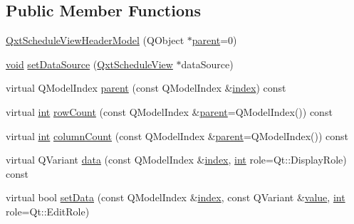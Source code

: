 \subsection*{Public Member Functions}
\begin{DoxyCompactItemize}
\item 
\hyperlink{class_qxt_schedule_view_header_model_a20e4f92d2f5cf0b79857829292564d18}{Qxt\-Schedule\-View\-Header\-Model} (Q\-Object $\ast$\hyperlink{class_qxt_schedule_view_header_model_af5e684555f4cc8ecab668a898cc92406}{parent}=0)
\item 
\hyperlink{group___u_a_v_objects_plugin_ga444cf2ff3f0ecbe028adce838d373f5c}{void} \hyperlink{class_qxt_schedule_view_header_model_a54435f3bf7b9c51dc365437e62ad3723}{set\-Data\-Source} (\hyperlink{class_qxt_schedule_view}{Qxt\-Schedule\-View} $\ast$data\-Source)
\item 
virtual Q\-Model\-Index \hyperlink{class_qxt_schedule_view_header_model_af5e684555f4cc8ecab668a898cc92406}{parent} (const Q\-Model\-Index \&\hyperlink{glext_8h_ab47dd9958bcadea08866b42bf358e95e}{index}) const 
\item 
virtual \hyperlink{ioapi_8h_a787fa3cf048117ba7123753c1e74fcd6}{int} \hyperlink{class_qxt_schedule_view_header_model_aa6feed4f1b077f3ecacbc9cb4c56a50e}{row\-Count} (const Q\-Model\-Index \&\hyperlink{class_qxt_schedule_view_header_model_af5e684555f4cc8ecab668a898cc92406}{parent}=Q\-Model\-Index()) const 
\item 
virtual \hyperlink{ioapi_8h_a787fa3cf048117ba7123753c1e74fcd6}{int} \hyperlink{class_qxt_schedule_view_header_model_aa317dff16d29f57d077268206ed78e5c}{column\-Count} (const Q\-Model\-Index \&\hyperlink{class_qxt_schedule_view_header_model_af5e684555f4cc8ecab668a898cc92406}{parent}=Q\-Model\-Index()) const 
\item 
virtual Q\-Variant \hyperlink{class_qxt_schedule_view_header_model_a2d512901fca8fa44e74ce638fbd572b4}{data} (const Q\-Model\-Index \&\hyperlink{glext_8h_ab47dd9958bcadea08866b42bf358e95e}{index}, \hyperlink{ioapi_8h_a787fa3cf048117ba7123753c1e74fcd6}{int} role=Qt\-::\-Display\-Role) const 
\item 
virtual bool \hyperlink{class_qxt_schedule_view_header_model_a51c3102c651949b46260fee7a4d3ce89}{set\-Data} (const Q\-Model\-Index \&\hyperlink{glext_8h_ab47dd9958bcadea08866b42bf358e95e}{index}, const Q\-Variant \&\hyperlink{glext_8h_aa0e2e9cea7f208d28acda0480144beb0}{value}, \hyperlink{ioapi_8h_a787fa3cf048117ba7123753c1e74fcd6}{int} role=Qt\-::\-Edit\-Role)
\item 

\end{DoxyCompactItemize}
